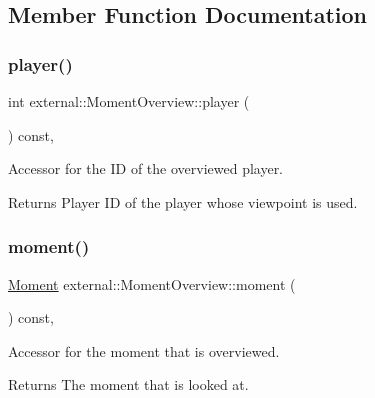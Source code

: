 \subsection{Member Function Documentation}
\mbox{\label{classexternal_1_1_moment_overview_afb04d3b50661c06510b77e73d66e70ac}} 
\subsubsection{\texorpdfstring{player()}{player()}}
{\footnotesize\ttfamily int external\+::\+Moment\+Overview\+::player (\begin{DoxyParamCaption}{ }\end{DoxyParamCaption}) const\hspace{0.3cm}{\ttfamily [inline]}, {\ttfamily [noexcept]}}



Accessor for the ID of the overviewed player. 

\begin{DoxyReturn}{Returns}
Player ID of the player whose viewpoint is used. 
\end{DoxyReturn}
\mbox{\label{classexternal_1_1_moment_overview_a6aaebaf6107f40bfb22a15f82c92e131}} 
\subsubsection{\texorpdfstring{moment()}{moment()}}
{\footnotesize\ttfamily \hyperlink{classtimeplane_1_1_moment}{Moment} external\+::\+Moment\+Overview\+::moment (\begin{DoxyParamCaption}{ }\end{DoxyParamCaption}) const\hspace{0.3cm}{\ttfamily [inline]}, {\ttfamily [noexcept]}}



Accessor for the moment that is overviewed. 

\begin{DoxyReturn}{Returns}
The moment that is looked at. 
\end{DoxyReturn}
\mbox{\label{classexternal_1_1_moment_overview_abeb27fa11c351eea2c90679842895497}} 
